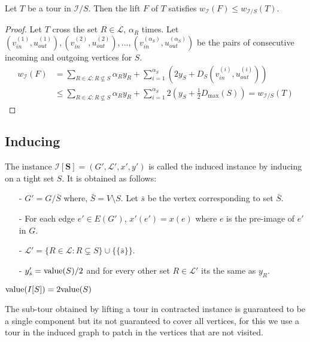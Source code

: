 \documentclass[./main.tex]{subfiles}
\newcommand{\calI}{\ensuremath{\mathcal{I}}}
\newcommand{\calL}{\ensuremath{\mathcal{L}}}
\begin{document}
	\begin{lemma}\label{lemm:3:lift-c}
		Let $T$ be a tour in $\calI/S$. Then the lift $F$ of $T$ satisfies $w_\calI(F) \leqslant w_{\calI/S}(T).$
	\end{lemma}
	\begin{proof}
		Let $T$ cross the set $R\in\calL$, $\alpha_R$ times. Let $\left(v_{in}^{(1)}, u_{out}^{(1)}\right), \left(v_{in}^{(2)}, u_{out}^{(2)}\right), \dots, \left(v_{in}^{(\alpha_S)}, u_{out}^{(\alpha_S)}\right)$ be the pairs of consecutive incoming and outgoing vertices for $S$.
		\begin{align*}
			w_\calI(F) &= \sum_{R \in \calL: R \nsubseteq S}\alpha_R y_R + \sum_{i = 1}^{\alpha_S}\left(2y_S + D_S\left(v_{in}^{(i)}, u_{out}^{(i)}\right)\right)\\
			&\leqslant\sum_{R \in \calL: R \nsubseteq S}\alpha_R y_R + \sum_{i = 1}^{\alpha_S}2\left(y_S + \frac{1}{2}D_{\max}(S)\right) = w_{\calI/S}(T)
		\end{align*}
	\end{proof}
	
	\subsection{Inducing}
	\begin{definition}
		The instance $\bm{\calI[S]} = (G', \calL', x', y')$ is called the induced instance by inducing on a tight set $S$. It is obtained as follows:
		\begin{itemize}
			\item[-] $G' = G/\bar{S}$ where, $\bar{S} = V\setminus S$. Let $\bar{s}$ be the vertex corresponding to set $\bar{S}$.
			\item[-] For each edge $e' \in E(G')$, $x'(e') = x(e)$ where $e$ is the pre-image of $e'$ in $G$.
			\item[-] $\calL' = \{R \in \calL : R \subsetneq S\} \cup \{\{\bar{s}\}\}$.
			\item[-] $y'_{\bar{s}} = \textup{value}(S)/2$ and for every other set $R \in \calL'$ its the same as $y_R$.
		\end{itemize}
	\end{definition}\vspace{2mm}
	
	\begin{fact}
		$\textup{value}(I[S]) = 2 \textup{value}(S)$
	\end{fact}

	The sub-tour obtained by lifting a tour in contracted instance is guaranteed to be a single component but its not guaranteed to cover all vertices, for this we use a tour in the induced graph to patch in the vertices that are not visited.
	
\end{document}
